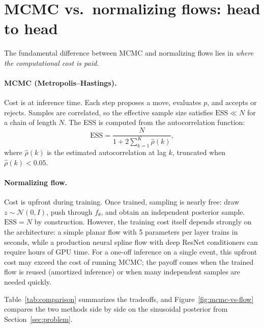 \documentclass[11pt,letterpaper]{article}
\begin{document}
\section{MCMC vs.\ normalizing flows: head to head}
\label{sec:comparison}

The fundamental difference between MCMC and normalizing flows lies
in \emph{where the computational cost is paid}.

\paragraph{MCMC (Metropolis--Hastings).}
Cost is at inference time.
Each step proposes a move, evaluates $p$, and accepts or rejects.
Samples are correlated, so the effective sample size satisfies
$\mathrm{ESS} \ll N$ for a chain of length $N$.
The ESS is computed from the autocorrelation function:
\begin{equation}
  \mathrm{ESS} = \frac{N}{1 + 2\sum_{k=1}^{K} \hat{\rho}(k)},
  \label{eq:ess}
\end{equation}
where $\hat{\rho}(k)$ is the estimated autocorrelation at lag $k$,
truncated when $\hat{\rho}(k) < 0.05$.

\paragraph{Normalizing flow.}
Cost is upfront during training.
Once trained, sampling is nearly free: draw $z \sim \mathcal{N}(0, I)$,
push through $f_\theta$, and obtain an independent posterior sample.
$\mathrm{ESS} = N$ by construction.
However, the training cost itself depends strongly on the architecture:
a simple planar flow with 5 parameters per layer trains in seconds,
while a production neural spline flow with deep ResNet conditioners can
require hours of GPU time.
For a one-off inference on a single event, this upfront cost may exceed
the cost of running MCMC; the payoff comes when the trained flow is
reused (amortized inference) or when many independent samples are
needed quickly.

Table~\ref{tab:comparison} summarizes the tradeoffs, and
Figure~\ref{fig:mcmc-vs-flow} compares the two methods side by side
on the sinusoidal posterior from Section~\ref{sec:problem}.
\end{document}
